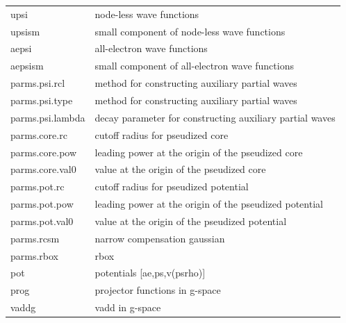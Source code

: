 \documentclass[final,12pt,makeidx,DIV=calc]{article}
\begin{document}
{{{{{{\begin{center}
\begin{tabular}{ll}
 upsi             & node-less wave functions                                 \\
 upsism           & small component of node-less wave functions              \\
 aepsi            & all-electron wave functions                              \\
 aepsism          & small component of all-electron wave functions           \\
 parms.psi.rcl    & method for constructing auxiliary partial waves          \\
 parms.psi.type   & method for constructing auxiliary partial waves          \\
 parms.psi.lambda & decay parameter for constructing auxiliary partial waves \\
 parms.core.rc    & cutoff radius for pseudized core                         \\
 parms.core.pow   & leading power at the origin of the pseudized core        \\
 parms.core.val0  & value at the origin of the pseudized core                \\
 parms.pot.rc     & cutoff radius for pseudized potential                    \\
 parms.pot.pow    & leading power at the origin of the pseudized potential   \\
 parms.pot.val0   & value at the origin of the pseudized potential           \\
 parms.rcsm       & narrow compensation gaussian                             \\
 parms.rbox       & rbox                                                     \\
 pot              & potentials [ae,ps,v(psrho)]                              \\
 prog             & projector functions in g-space                           \\
 vaddg            & vadd in g-space                                          \\
\end{tabular}
\end{center}

 
 
 
 
 
 
 
 
 
 
 
 
 
 
}}}}}}
\end{document}
